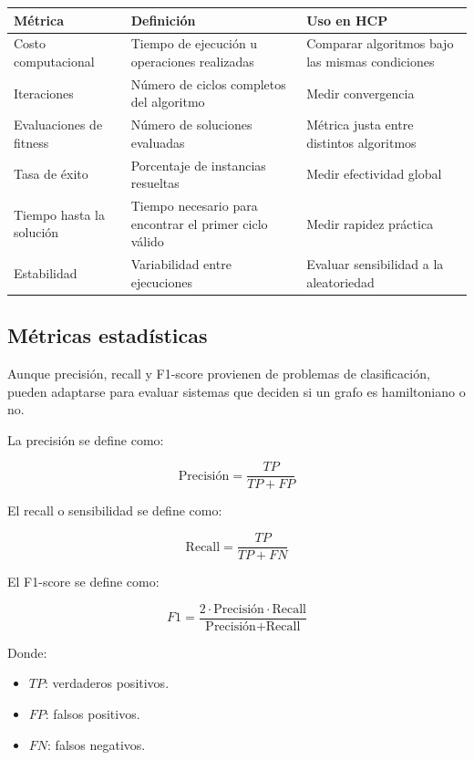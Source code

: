 \documentclass[12pt]{article}
\begin{document}
\begin{table}[h]
\centering
\begin{tabular}{lll}
\toprule
\textbf{Métrica} & \textbf{Definición} & \textbf{Uso en HCP} \\
\midrule
Costo computacional & Tiempo de ejecución u operaciones realizadas & Comparar algoritmos bajo las mismas condiciones \\
Iteraciones & Número de ciclos completos del algoritmo & Medir convergencia \\
Evaluaciones de fitness & Número de soluciones evaluadas & Métrica justa entre distintos algoritmos \\
Tasa de éxito & Porcentaje de instancias resueltas & Medir efectividad global \\
Tiempo hasta la solución & Tiempo necesario para encontrar el primer ciclo válido & Medir rapidez práctica \\
Estabilidad & Variabilidad entre ejecuciones & Evaluar sensibilidad a la aleatoriedad \\
\bottomrule
\end{tabular}
\end{table}

\subsection{Métricas estadísticas}

Aunque precisión, recall y F1-score provienen de problemas de clasificación, pueden adaptarse para evaluar sistemas que deciden si un grafo es hamiltoniano o no.

La precisión se define como:

\[
\text{Precisión}=\frac{TP}{TP+FP}
\]

El recall o sensibilidad se define como:

\[
\text{Recall}=\frac{TP}{TP+FN}
\]

El F1-score se define como:

\[
F1=\frac{2 \cdot \text{Precisión} \cdot \text{Recall}}{\text{Precisión}+\text{Recall}}
\]

Donde:

\begin{itemize}
    \item \(TP\): verdaderos positivos.
    \item \(FP\): falsos positivos.
    \item \(FN\): falsos negativos.
\end{itemize}
\end{document}
